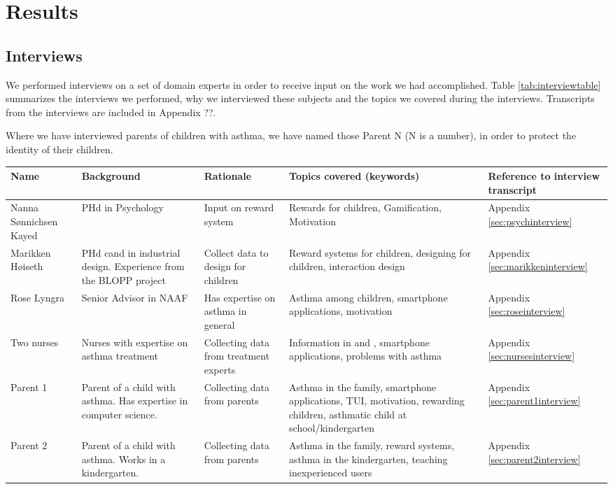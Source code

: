 \chapter{Results}
\label{chp:results}

\section{Interviews}
\label{sec:interviewresults}

We performed interviews on a set of domain experts in order to receive input on the work we had accomplished. Table \ref{tab:interviewtable} summarizes the interviews we performed, why we interviewed these subjects and the topics we covered during the interviews. Transcripts from the interviews are included in Appendix ??. 

Where we have interviewed parents of children with asthma, we have named those Parent N (N is a number), in order to protect the identity of their children.  

\begin{sidewaystable}
\label{tab:interviewtable}
\centering
\begin{tabular}{| p{3.0cm} | p{4.0cm} | p{3.5cm} | p{6.0cm} | p{2.5cm} |}
	\hline
	\textbf{Name} & \textbf{Background} & \textbf{Rationale} & \textbf{Topics covered (keywords)} & \textbf{Reference to interview transcript} \\
	\hline
	Nanna S\o nnichsen Kayed & PHd in Psychology & Input on reward system & Rewards for children, Gamification, Motivation & Appendix \ref{sec:psychinterview} \\
	\hline
	Marikken H\o iseth & PHd cand in industrial design. Experience from the BLOPP project & Collect data to design for children & Reward systems for children, designing for children, interaction design & Appendix \ref{sec:marikkeninterview} \\
	\hline
	Rose Lyngra & Senior Advisor in NAAF & Has expertise on asthma in general & Asthma among children, smartphone applications, motivation & Appendix \ref{sec:roseinterview} \\
	\hline
	Two nurses & Nurses with expertise on asthma treatment & Collecting data from treatment experts &Information in \ab{} and \app{}, smartphone applications, problems with asthma & Appendix \ref{sec:nursesinterview} \\
	\hline
	Parent 1 & Parent of a child with asthma. Has expertise in computer science. & Collecting data from parents & Asthma in the family, smartphone applications, TUI, motivation, rewarding children, asthmatic child at school/kindergarten & Appendix \ref{sec:parent1interview} \\
	\hline
	Parent 2 & Parent of a child with asthma. Works in a kindergarten. & Collecting data from parents & Asthma in the family, reward systems, asthma in the kindergarten, teaching inexperienced users & Appendix \ref{sec:parent2interview} \\
	\hline     
\end{tabular}
\caption{Interviews performed during the project}
\end{sidewaystable}  

